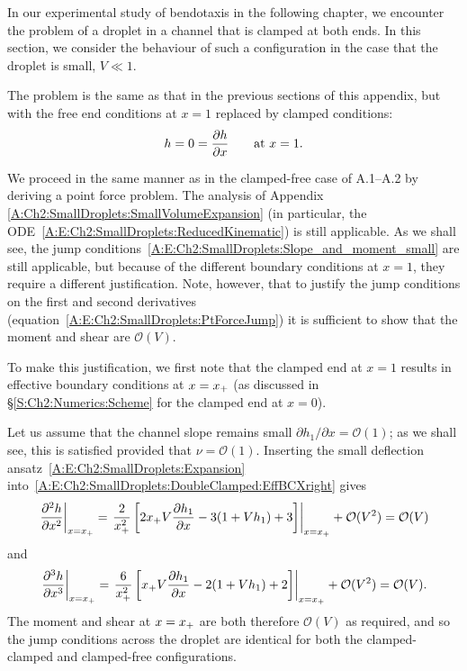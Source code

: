 \begin{subappendices}
In our experimental study of bendotaxis in the following chapter, we encounter the problem of a droplet in a channel that is clamped at both ends. In this section, we consider the behaviour of such a configuration in the case that the droplet is small, $V\ll 1$.

The problem is the same as that in the previous sections of this appendix, but with the free end conditions at $x = 1$ replaced by clamped conditions:
\begin{equation}
h = 0 = \frac{\partial h}{\partial x} \qquad \text{at}~x = 1.
\end{equation}

We proceed in the same manner as in the clamped-free case of A.1--A.2 by deriving a point force problem. The analysis of Appendix \ref{A:Ch2:SmallDroplets:SmallVolumeExpansion} (in particular, the ODE~\eqref{A:E:Ch2:SmallDroplets:ReducedKinematic}) is still applicable. As we shall see, the jump conditions~\eqref{A:E:Ch2:SmallDroplets:Slope_and_moment_small} are still applicable, but because of the different boundary conditions at $x = 1$, they require a different justification.  Note, however, that to justify the jump conditions on the first and second derivatives (equation~\eqref{A:E:Ch2:SmallDroplets:PtForceJump}) it is sufficient to show that the moment and shear are $\mathcal{O}(V)$.

To make this justification, we first note that the clamped end at $x = 1$ results in effective boundary conditions
at $x = x_{+}$ (as discussed in \S\ref{S:Ch2:Numerics:Scheme} for the clamped end at $x = 0$).

Let us assume that the channel slope remains small  $\partial h_1 /\partial x = \mathcal{O}(1)$; as we shall see, this is satisfied provided that $\nu = \mathcal{O}(1)$.  Inserting the small deflection ansatz~\eqref{A:E:Ch2:SmallDroplets:Expansion} into~\eqref{A:E:Ch2:SmallDroplets:DoubleClamped:EffBCXright} gives
\begin{equation}
\left.\frac{\partial ^2 h}{\partial x^2}\right|_{x = x_{+}} =\left. \frac{2}{x_{+}^2}\left[2x_{+} V\frac{\partial h_1}{\partial x} - 3(1 + V h_1) + 3\right]\right|_{x = x_{+}} + \mathcal{O}(V^2)  =   \mathcal{O}(V)
\end{equation}
and
\begin{equation}
\left.\frac{\partial ^3 h}{\partial x^3}\right|_{x = x_{+}} =\left. \frac{6}{x_{+}^2}\left[x_{+} V\frac{\partial h_1}{\partial x} - 2(1 + V h_1) + 2\right]\right|_{x = x_{+}} + \mathcal{O}(V^2)  =   \mathcal{O}(V).
\end{equation}
The moment and shear at $x  = x_{+}$ are both therefore $\mathcal{O}(V)$ as required, and so the jump conditions across the droplet are identical for both the clamped-clamped and clamped-free configurations.


\end{subappendices}
